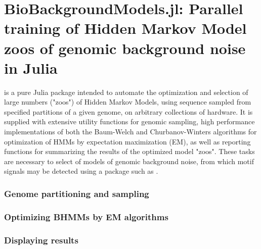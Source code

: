 \chapter{BioBackgroundModels.jl: Parallel training of Hidden Markov Model zoos of genomic background noise in Julia}
\label{ch:BBM}

 is a pure Julia package intended to automate the optimization and selection of large numbers ("zoos") of Hidden Markov Models, using sequence sampled from specified partitions of a given genome, on arbitrary collections of hardware. It is supplied with extensive utility functions for genomic sampling, high performance implementations of both the Baum-Welch and Churbanov-Winters algorithms for optimization of HMMs by expectation maximization (EM), as well as reporting functions for summarizing the results of the optimized model "zoos". These tasks are necessary to select of models of genomic background noise, from which motif signals may be detected using a package such as .

\subsection{Genome partitioning and sampling}



\subsection{Optimizing BHMMs by EM algorithms}


\subsection{Displaying results}